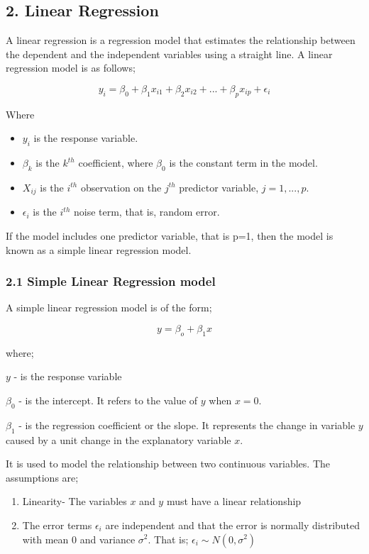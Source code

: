 \documentclass[
]{article}
\begin{document}
\hypertarget{linear-regression}{%
\subsection{2. Linear Regression}\label{linear-regression}}

A linear regression is a regression model that estimates the
relationship between the dependent and the independent variables using a
straight line. A linear regression model is as follows;

\[y_i=\beta_0+\beta_1x_{i1}+\beta_2x_{i2}+{...}+\beta_px_{ip}+\epsilon_i\]

Where

\begin{itemize}
\item
  \(y_i\) is the response variable.
\item
  \(\beta_k\) is the \(k^{th}\) coefficient, where \(\beta_0\) is the
  constant term in the model.
\item
  \(X_{ij}\) is the \(i^{th}\) observation on the \(j^{th}\) predictor
  variable, \(j = 1, ..., p.\)
\item
  \(\epsilon_i\) is the \(i^{th}\) noise term, that is, random error.
\end{itemize}

If the model includes one predictor variable, that is p=1, then the
model is known as a simple linear regression model.

\hypertarget{simple-linear-regression-model}{%
\subsubsection{2.1 Simple Linear Regression
model}\label{simple-linear-regression-model}}

A simple linear regression model is of the form;

\[y=\beta_o+\beta_1x\]

where;

\(y\) - is the response variable

\(\beta_0\) - is the intercept. It refers to the value of \(y\) when
\(x=0\).

\(\beta_1\) - is the regression coefficient or the slope. It represents
the change in variable \(y\) caused by a unit change in the explanatory
variable \(x\).

It is used to model the relationship between two continuous variables.
The assumptions are;

\begin{enumerate}
\def\labelenumi{\arabic{enumi}.}
\item
  Linearity- The variables \(x\) and \(y\) must have a linear
  relationship
\item
  The error terms \(\epsilon_i\) are independent and that the error is
  normally distributed with mean 0 and variance \(\sigma^2\). That is;
  \(\epsilon_i\sim N(0,\sigma^2)\)
\end{enumerate}
\end{document}
